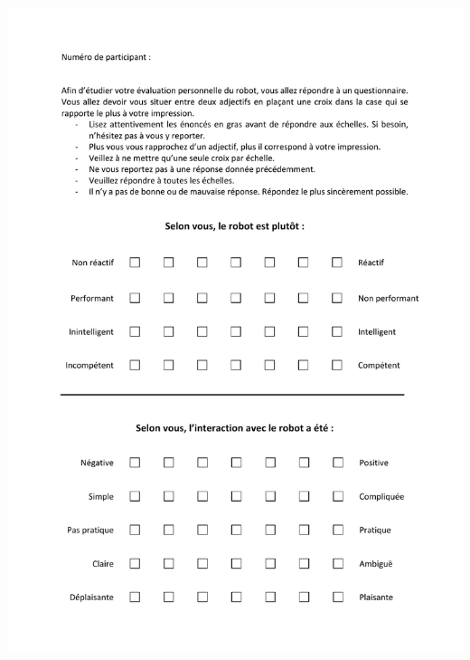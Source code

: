 \begin{center}
\includegraphics[page=2, width=\textwidth]{Annexes/PeRDITA_vParticipant_sansDimVerbale.pdf} 
\end{center}

